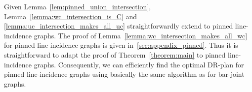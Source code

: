 Given Lemma~\ref{lem:pinned_union_intersection}, %
Lemma~\ref{lemma:wc_intersection_is_C} and \ref{lemma:uc_intersection_makes_all_uc} straightforwardly extend to  pinned line-incidence graphs. The proof of Lemma~\ref{lemma:wc_intersection_makes_all_wc} for pinned line-incidence graphs is given in~\ref{sec:appendix_pinned}.
Thus it is straightforward to adapt the proof of Theorem~\ref{theorem:main} to  pinned line-incidence graphs.
%
Consequently, we can efficiently find the optimal DR-plan for  pinned line-incidence graphs using basically the same algorithm as for  bar-joint graphs.




